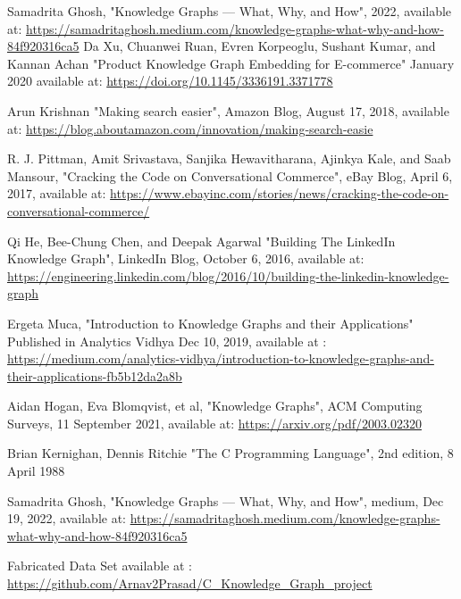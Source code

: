 \documentclass[conference]{IEEEtran}
\begin{document}
\begin{thebibliography}{00}

 Samadrita Ghosh, "Knowledge Graphs — What, Why, and How", 2022, available at: \url{https://samadritaghosh.medium.com/knowledge-graphs-what-why-and-how-84f920316ca5}
 Da Xu, Chuanwei Ruan, Evren Korpeoglu, Sushant Kumar, and Kannan Achan "Product Knowledge Graph Embedding for E-commerce"  January 2020 available at: \url{https://doi.org/10.1145/3336191.3371778}

 Arun Krishnan "Making search easier", Amazon Blog, August 17, 2018, available at: \url{https://blog.aboutamazon.com/innovation/making-search-easie}

 R. J. Pittman, Amit Srivastava, Sanjika Hewavitharana, Ajinkya Kale, and Saab Mansour, "Cracking the Code on Conversational Commerce", eBay Blog,  April 6, 2017, available at:  \url{https://www.ebayinc.com/stories/news/cracking-the-code-on-conversational-commerce/}

Qi He, Bee-Chung Chen, and Deepak Agarwal "Building The
LinkedIn Knowledge Graph", LinkedIn Blog,  October 6, 2016, available at: \url{https://engineering.linkedin.com/blog/2016/10/building-the-linkedin-knowledge-graph}


 Ergeta Muca, "Introduction to Knowledge Graphs and their Applications" Published in
Analytics Vidhya Dec 10, 2019, available 
at : \url{https://medium.com/analytics-vidhya/introduction-to-knowledge-graphs-and-their-applications-fb5b12da2a8b}

 Aidan Hogan, Eva Blomqvist, et al, "Knowledge Graphs", ACM
Computing Surveys, 11 September 2021,  available at: \url{https://arxiv.org/pdf/2003.02320}

 Brian Kernighan, Dennis Ritchie "The C Programming Language", 2nd edition, 8 April 1988

 Samadrita Ghosh, "Knowledge Graphs — What, Why, and How", medium, Dec 19, 2022, available at: \url{https://samadritaghosh.medium.com/knowledge-graphs-what-why-and-how-84f920316ca5}

 Fabricated Data Set available at : \url{https://github.com/Arnav2Prasad/C_Knowledge_Graph_project}


\end{thebibliography}
\end{document}
